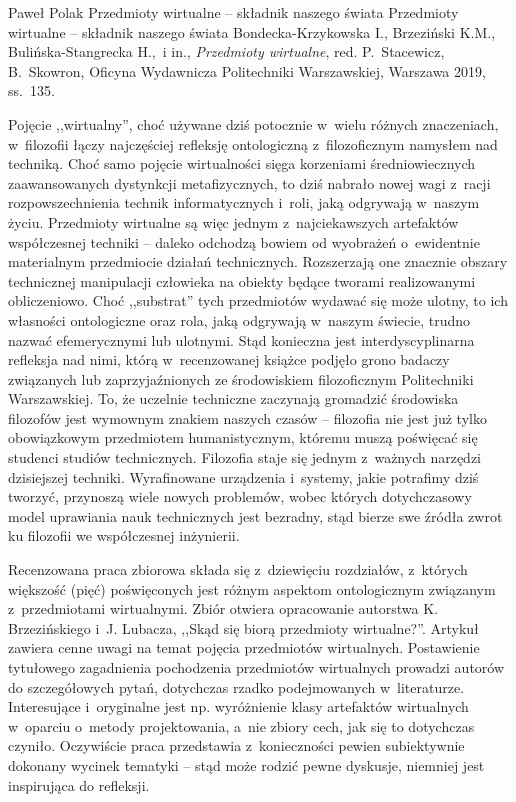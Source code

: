\begin{recplenv}{Paweł Polak}
	{Przedmioty wirtualne -- składnik naszego świata}
	{Przedmioty wirtualne -- składnik naszego świata}
	{Bondecka-Krzykowska I., Brzeziński K.M., Bulińska-Stangrecka H.,~i in., \textit{Przedmioty wirtualne}, red. P.~Stacewicz, B.~Skowron, Oficyna Wydawnicza Politechniki Warszawskiej, Warszawa 2019, ss.~135.}






Pojęcie ,,wirtualny'', choć używane dziś potocznie w~wielu różnych znaczeniach, w~filozofii łączy najczęściej refleksję ontologiczną z~filozoficznym namysłem nad techniką. Choć samo pojęcie wirtualności sięga korzeniami średniowiecznych zaawansowanych dystynkcji metafizycznych, to dziś nabrało nowej wagi z~racji rozpowszechnienia technik informatycznych i~roli, jaką odgrywają w~naszym życiu. Przedmioty wirtualne są więc jednym z~najciekawszych artefaktów współczesnej techniki -- daleko odchodzą bowiem od wyobrażeń o~ewidentnie materialnym przedmiocie działań technicznych. Rozszerzają one znacznie obszary technicznej manipulacji człowieka na obiekty będące tworami realizowanymi obliczeniowo. Choć ,,substrat'' tych przedmiotów wydawać się może ulotny, to ich własności ontologiczne oraz rola, jaką odgrywają w~naszym świecie, trudno nazwać efemerycznymi lub ulotnymi. Stąd konieczna jest interdyscyplinarna refleksja nad nimi, którą w~recenzowanej książce podjęło grono badaczy związanych lub zaprzyjaźnionych ze środowiskiem filozoficznym Politechniki Warszawskiej. To, że uczelnie techniczne zaczynają gromadzić środowiska filozofów jest wymownym znakiem naszych czasów -- filozofia nie jest już tylko obowiązkowym przedmiotem humanistycznym, któremu muszą poświęcać się studenci studiów technicznych. Filozofia staje się jednym z~ważnych narzędzi dzisiejszej techniki. Wyrafinowane urządzenia i~systemy, jakie potrafimy dziś tworzyć, przynoszą wiele nowych problemów, wobec których dotychczasowy model uprawiania nauk technicznych jest bezradny, stąd bierze swe źródła zwrot ku filozofii we współczesnej inżynierii.

Recenzowana praca zbiorowa składa się z~dziewięciu rozdziałów, z~których większość (pięć) poświęconych jest różnym aspektom ontologicznym związanym z~przedmiotami wirtualnymi. Zbiór otwiera opracowanie autorstwa K. Brzezińskiego i~J. Lubacza, ,,Skąd się biorą przedmioty wirtualne?''. Artykuł zawiera cenne uwagi na temat pojęcia przedmiotów wirtualnych. Postawienie tytułowego zagadnienia pochodzenia przedmiotów wirtualnych prowadzi autorów do szczegółowych pytań, dotychczas rzadko podejmowanych w~literaturze. Interesujące i~oryginalne jest np. wyróżnienie klasy artefaktów wirtualnych w~oparciu o~metody projektowania, a~nie zbiory cech, jak się to dotychczas czyniło. Oczywiście praca przedstawia z~konieczności pewien subiektywnie dokonany wycinek tematyki -- stąd może rodzić pewne dyskusje, niemniej jest inspirująca do refleksji.


\end{recplenv}
